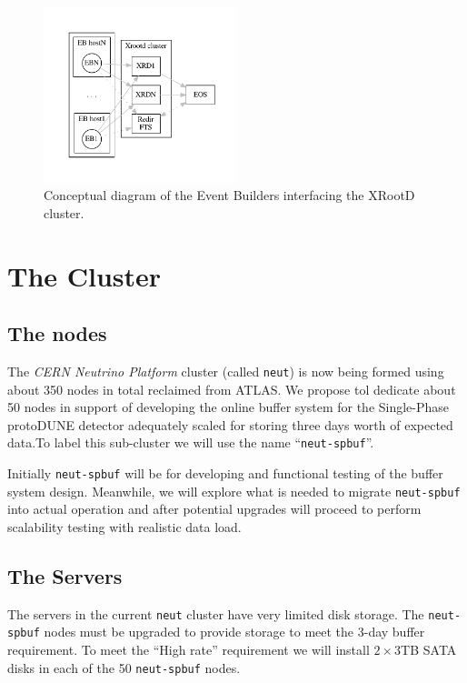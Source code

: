 \documentclass[pdftex,12pt,letter]{article}
\begin{document}
\begin{figure}[tbh]
  \centering
  \includegraphics[width=0.5\textwidth]{figures/doob-join.pdf}
  \caption{Conceptual diagram of the Event Builders interfacing the XRootD cluster.}
  \label{fig:doob-join}
\end{figure}

\section{The Cluster}
\subsection{The nodes}

The \textit{CERN Neutrino Platform} cluster (called \texttt{neut}) is now being formed using about 350 nodes in
total reclaimed from ATLAS.  We propose tol dedicate about 50 nodes in
support of developing the online buffer system for the Single-Phase
protoDUNE detector adequately scaled for storing three days worth of
expected data.To label this sub-cluster we will use the name ``\texttt{neut-spbuf}''.

Initially \texttt{neut-spbuf} will be for developing and functional testing of the buffer system design. 
Meanwhile, we will explore what is needed to migrate \texttt{neut-spbuf} into actual
operation and after potential upgrades will proceed to perform scalability testing with realistic data load.

\subsection{The Servers}

The servers in the current \texttt{neut} cluster have very limited disk storage.  The
\texttt{neut-spbuf} nodes must be upgraded to provide storage to meet
the 3-day buffer requirement. To meet the ``High rate'' requirement we
will install $2\times 3$TB SATA disks in each of the 50
\texttt{neut-spbuf} nodes.
\end{document}
